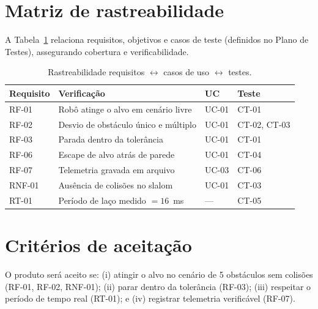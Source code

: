 \section{Matriz de rastreabilidade}\label{sec:rastr}
A Tabela~\ref{tab:rastr} relaciona requisitos, objetivos e casos de teste (definidos no Plano de Testes), assegurando cobertura e verificabilidade.

\begin{table}[H]\centering
\caption{Rastreabilidade requisitos $\leftrightarrow$ casos de uso $\leftrightarrow$ testes.}
\label{tab:rastr}
\begin{tabularx}{\textwidth}{@{}l X l l@{}}
\toprule
\textbf{Requisito} & \textbf{Verificação} & \textbf{UC} & \textbf{Teste} \\
\midrule
RF-01 & Robô atinge o alvo em cenário livre & UC-01 & CT-01 \\
RF-02 & Desvio de obstáculo único e múltiplo & UC-01 & CT-02, CT-03 \\
RF-03 & Parada dentro da tolerância & UC-01 & CT-01 \\
RF-06 & Escape de alvo atrás de parede & UC-01 & CT-04 \\
RF-07 & Telemetria gravada em arquivo & UC-03 & CT-06 \\
RNF-01 & Ausência de colisões no slalom & UC-01 & CT-03 \\
RT-01 & Período de laço medido $=16$~ms & --- & CT-05 \\
\bottomrule
\end{tabularx}
\end{table}

\section{Critérios de aceitação}
O produto será aceito se: (i) atingir o alvo no cenário de 5 obstáculos sem colisões (RF-01, RF-02, RNF-01); (ii) parar dentro da tolerância (RF-03); (iii) respeitar o período de tempo real (RT-01); e (iv) registrar telemetria verificável (RF-07).


